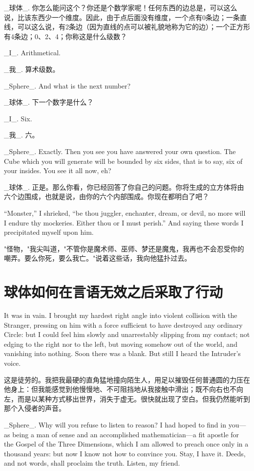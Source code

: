 \documentclass[12pt,UTF8]{ctexbook}
\begin{document}
\_球体\_. 你怎么能问这个？你还是个数学家呢！任何东西的边总是，可以这么说，比该东西少一个维度。因此，由于点后面没有维度，一个点有0条边；一条直线，可以这么说，有2条边（因为直线的点可以被礼貌地称为它的边）；一个正方形有4条边；0、2、4；你称这是什么级数？

\_I\_. Arithmetical.

\_我\_. 算术级数。

\_Sphere\_. And what is the next number?

\_球体\_. 下一个数字是什么？

\_I\_. Six.

\_我\_. 六。

\_Sphere\_. Exactly. Then you see you have answered your own question. The Cube which you will generate will be bounded by six sides, that is to say, six of your insides. You see it all now, eh?

\_球体\_. 正是。那么你看，你已经回答了你自己的问题。你将生成的立方体将由六个边围成，也就是说，由你的六个内部围成。你现在都明白了吧？

``Monster,'' I shrieked, ``be thou juggler, enchanter, dream, or devil, no more will I endure thy mockeries. Either thou or I must perish.'' And saying these words I precipitated myself upon him.

"怪物，"我尖叫道，"不管你是魔术师、巫师、梦还是魔鬼，我再也不会忍受你的嘲弄。要么你死，要么我亡。"说着这些话，我向他猛扑过去。

\chapter{球体如何在言语无效之后采取了行动}

It was in vain. I brought my hardest right angle into violent collision with the Stranger, pressing on him with a force sufficient to have destroyed any ordinary Circle: but I could feel him slowly and unarrestably slipping from my contact; not edging to the right nor to the left, but moving somehow out of the world, and vanishing into nothing. Soon there was a blank. But still I heard the Intruder's voice.

这是徒劳的。我把我最硬的直角猛地撞向陌生人，用足以摧毁任何普通圆的力压在他身上：但我能感觉到他慢慢地、不可阻挡地从我接触中滑出；既不向右也不向左，而是以某种方式移出世界，消失于虚无。很快就出现了空白。但我仍然能听到那个入侵者的声音。

\_Sphere\_. Why will you refuse to listen to reason? I had hoped to find in you---as being a man of sense and an accomplished mathematician---a fit apostle for the Gospel of the Three Dimensions, which I am allowed to preach once only in a thousand years: but now I know not how to convince you. Stay, I have it. Deeds, and not words, shall proclaim the truth. Listen, my friend.
\end{document}
